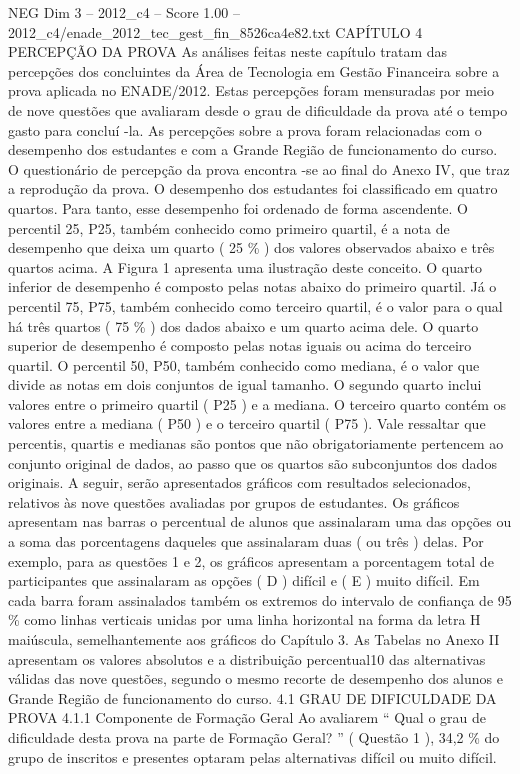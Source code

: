 \begin{textsample}{NEG Dim 3 – 2012\_c4 – Score 1.00 – 2012\_c4/enade\_2012\_tec\_gest\_fin\_8526ca4e82.txt}  \label{ex:f3_neg_127}
CAPÍTULO 4 PERCEPÇÃO DA PROVA As análises feitas neste capítulo tratam das percepções dos concluintes da Área de Tecnologia em Gestão Financeira sobre a prova aplicada no ENADE/2012.
Estas percepções foram mensuradas por meio de nove questões que avaliaram desde o grau de dificuldade da prova até o tempo gasto para concluí -la.
As percepções sobre a prova foram relacionadas com o desempenho dos estudantes e com a Grande Região de funcionamento do curso.
O questionário de percepção da prova encontra -se ao final do Anexo IV, que traz a reprodução da prova.
O desempenho dos estudantes foi classificado em quatro quartos.
Para tanto, esse desempenho foi ordenado de forma ascendente.
O percentil 25, P25, também conhecido como primeiro quartil, é a nota de desempenho que deixa um quarto ( 25 \% ) dos valores observados abaixo e três quartos acima.
A Figura 1 apresenta uma ilustração deste conceito.
O quarto inferior de desempenho é composto pelas notas abaixo do primeiro quartil.
Já o percentil 75, P75, também conhecido como terceiro quartil, é o valor para o qual há três quartos ( 75 \% ) dos dados abaixo e um quarto acima dele.
O quarto superior de desempenho é composto pelas notas iguais ou acima do terceiro quartil.
O percentil 50, P50, também conhecido como mediana, é o valor que divide as notas em dois conjuntos de igual tamanho.
O segundo quarto inclui valores entre o primeiro quartil ( P25 ) e a mediana.
O terceiro quarto contém os valores entre a mediana ( P50 ) e o terceiro quartil ( P75 ).
Vale ressaltar que percentis, quartis e medianas são pontos que não obrigatoriamente pertencem ao conjunto original de dados, ao passo que os quartos são subconjuntos dos dados originais.
A seguir, serão apresentados gráficos com resultados selecionados, relativos às nove questões avaliadas por grupos de estudantes.
Os gráficos apresentam nas barras o percentual de alunos que assinalaram uma das opções ou a soma das porcentagens daqueles que assinalaram duas ( ou três ) delas.
Por exemplo, para as questões 1 e 2, os gráficos apresentam a porcentagem total de participantes que assinalaram as opções ( D ) difícil e ( E ) muito difícil.
Em cada barra foram assinalados também os extremos do intervalo de confiança de 95 \% como linhas verticais unidas por uma linha horizontal na forma da letra H maiúscula, semelhantemente aos gráficos do Capítulo 3.
As Tabelas no Anexo II apresentam os valores absolutos e a distribuição percentual10 das alternativas válidas das nove questões, segundo o mesmo recorte de desempenho dos alunos e Grande Região de funcionamento do curso. 4.1 GRAU DE DIFICULDADE DA PROVA 4.1.1 Componente de Formação Geral Ao avaliarem “ Qual o grau de dificuldade desta prova na parte de Formação Geral? ” ( Questão 1 ), 34,2 \% do grupo de inscritos e presentes optaram pelas alternativas difícil ou muito difícil.

\end{textsample}
